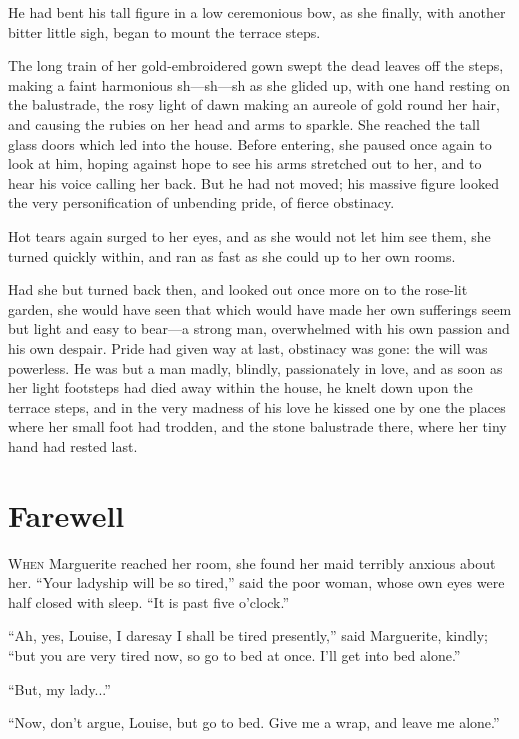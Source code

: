 \documentclass[paper=a5,BCOR=7mm,twoside,DIV=calc,12pt,usegeometry,chapterprefix,endperiod,headings=big]{scrbook}
\begin{document}
He had bent his tall figure in a low ceremonious bow, as she finally, with another bitter little sigh, began to mount the terrace steps.

The long train of her gold-embroidered gown swept the dead leaves off the steps, making a faint harmonious sh---sh---sh as she glided up, with one hand resting on the balustrade, the rosy light of dawn making an aureole of gold round her hair, and causing the rubies on her head and arms to sparkle. She reached the tall glass doors which led into the house. Before entering, she paused once again to look at him, hoping against hope to see his arms stretched out to her, and to hear his voice calling her back. But he had not moved; his massive figure looked the very personification of unbending pride, of fierce obstinacy.

Hot tears again surged to her eyes, and as she would not let him see them, she turned quickly within, and ran as fast as she could up to her own rooms.

Had she but turned back then, and looked out once more on to the rose-lit garden, she would have seen that which would have made her own sufferings seem but light and easy to bear---a strong man, overwhelmed with his own passion and his own despair. Pride had given way at last, obstinacy was gone: the will was powerless. He was but a man madly, blindly, passionately in love, and as soon as her light footsteps had died away within the house, he knelt down upon the terrace steps, and in the very madness of his love he kissed one by one the places where her small foot had trodden, and the stone balustrade there, where her tiny hand had rested last.

\chapter{Farewell}
\lettrine[lines=4]{W}{hen} Marguerite reached her room, she found her maid terribly anxious about her. \enquote{Your ladyship will be so tired,} said the poor woman, whose own eyes were half closed with sleep. \enquote{It is past five o'clock.}

\enquote{Ah, yes, Louise, I daresay I shall be tired presently,} said Marguerite, kindly; \enquote{but you are very tired now, so go to bed at once. I'll get into bed alone.}

\enquote{But, my lady...}

\enquote{Now, don't argue, Louise, but go to bed. Give me a wrap, and leave me alone.}
\end{document}
